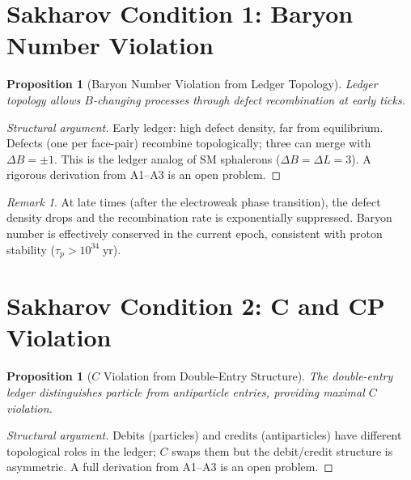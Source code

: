 \documentclass[12pt,a4paper]{article}
\newtheorem{proposition}[theorem]{Proposition}
\theoremstyle{definition}
\theoremstyle{remark}
\newtheorem{remark}[theorem]{Remark}
\begin{document}
\section{Sakharov Condition 1: Baryon Number Violation}
\label{sec:b-violation}

\begin{proposition}[Baryon Number Violation from Ledger Topology]
\label{thm:b-violation}
Ledger topology allows $B$-changing processes through defect
recombination at early ticks.
\end{proposition}

\begin{proof}[Structural argument]
Early ledger: high defect density, far from equilibrium.  Defects
(one per face-pair) recombine topologically; three can merge with
$\Delta B = \pm 1$.  This is the ledger analog of SM sphalerons
($\Delta B = \Delta L = 3$).  A rigorous derivation from A1--A3
is an open problem.
\end{proof}

\begin{remark}
At late times (after the electroweak phase transition), the defect
density drops and the recombination rate is exponentially suppressed.
Baryon number is effectively conserved in the current epoch,
consistent with proton stability ($\tau_p > 10^{34}\;\mathrm{yr}$).
\end{remark}

\section{Sakharov Condition 2: C and CP Violation}
\label{sec:cp-violation}

\begin{proposition}[$C$ Violation from Double-Entry Structure]
\label{thm:c-violation}
The double-entry ledger distinguishes particle from antiparticle
entries, providing maximal $C$ violation.
\end{proposition}

\begin{proof}[Structural argument]
Debits (particles) and credits (antiparticles) have different
topological roles in the ledger; $C$ swaps them but the
debit/credit structure is asymmetric.  A full derivation from
A1--A3 is an open problem.
\end{proof}
\end{document}
